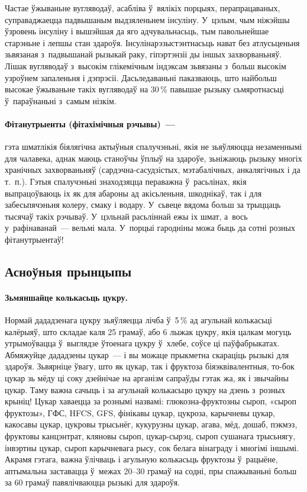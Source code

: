 Частае ўжываньне вугляводаў, асабліва ў~вялікіх порцыях, перапрацаваных, суправаджаецца падвышаным выдзяленьнем інсуліну. У~цэлым, чым ніжэйшы ўзровень інсуліну і вышэйшая да яго адчувальнасьць, тым павольнейшае старэньне і лепшы стан здароўя. Інсулінарэзыстэнтнасьць нават без атлусьценьня зьвязаная з~падвышанай рызыкай раку, гіпэртэнзіі ды іншых захворваньняў. Лішак вугляводаў з~высокім глікемічным індэксам зьвязаны з~больш высокім узроўнем запаленьня і дэпрэсіі. Дасьледаваньні паказваюць, што найбольш высокае ўжываньне такіх вугляводаў на 30\,\% павышае рызыку сьмяротнасьці ў~параўнаньні з~самым нізкім.

\paragraph{Фітанутрыенты (фітахімічныя рэчывы)~---} гэта шматлікія біялягічна актыўныя спалучэньні, якія не зьяўляюцца незаменнымі для чалавека, аднак маюць станоўчы ўплыў на здароўе, зьніжаюць рызыку многіх хранічных захворваньняў (сардэчна-сасудзістых, мэтабалічных, анкалягічных і да т.~п.). Гэтыя спалучэньні знаходзяцца пераважна ў~расьлінах, якія выпрацоўваюць іх як для абароны ад акісьленьня, шкоднікаў, так і для забесьпячэньня колеру, смаку і водару. У~сьвеце вядома больш за трыццаць тысячаў такіх рэчываў. У~цэльнай расьліннай ежы іх шмат, а~вось у~рафінаванай~--- вельмі мала. У~порцыі гародніны можа быць да сотні розных фітанутрыентаў!

\subsection{Асноўныя прынцыпы}

\paragraph{Зьмяншайце колькасьць цукру.}
Нормай дададзенага цукру зьяўляецца лічба ў~5\,\% ад агульнай колькасьці калёрыяў, што складае каля 25 грамаў, або 6 лыжак цукру, якія цалкам могуць утрымоўвацца ў~выглядзе ўтоенага цукру ў~хлебе, соўсе ці паўфабрыкатах. Абмяжуйце дададзены цукар~--- і вы можаце прыкметна скараціць рызыкі для здароўя. Зьвярніце ўвагу, што як цукар, так і фруктоза біяэквівалентныя, то-бок цукар зь мёду ці соку дзейнічае на арганізм сапраўды гэтак жа, як і звычайны цукар. Таму важна сачыць і за агульнай колькасьцю цукру на дзень з~розных крыніц! Цукар хаваецца за рознымі назвамі: глюкозна-фруктозны сыроп, «сыроп фруктозы», ГФС, HFCS, GFS, фінікавы цукар, цукроза, карычневы цукар, какосавы цукар, цукровы трысьнёг, кукурузны цукар, агава, мёд, дошаб, пэкмэз, фруктовы канцэнтрат, кляновы сыроп, цукар-сырэц, сыроп сушанага трысьнягу, інвэртны цукар, сыроп карычневага рысу, сок белага вінаграду і многімі іншымі. Акрамя гэтага, важна ўлічваць і агульную колькасьць фруктозы ў~рацыёне, аптымальна заставацца ў~межах 20--30 грамаў на содні, пры спажываньні больш за 60 грамаў павялічваюцца рызыкі для здароўя.

